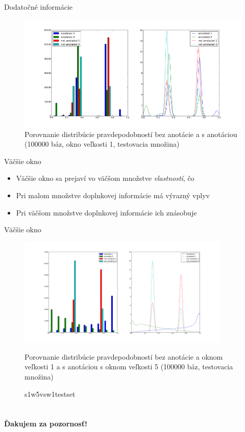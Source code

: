 \documentclass[xcolor=dvipsnames, compress, 12pt]{beamer}
\begin{document}
\begin{frame}{Dodatočné informácie}  
\begin{figure}[hbtp]
    \centering
    \includegraphics[width=\textwidth]{images/porovnanie_s1w1testset.png}
    \caption{Porovnanie distribúcie pravdepodobností bez anotácie a s anotáciou (100000 báz, okno veľkosti 1, testovacia množina)}    
    \label{fig:porovnanie_s1w1testset.png} 
\end{figure}
\end{frame}

\begin{frame}{Väčšie okno}  
  \begin{itemize}
    \item Väčšie okno sa prejaví vo väčšom množstve \textit{vlastností}, čo 
    \item Pri malom množstve doplnkovej informácie má výrazný vplyv 
    \item Pri väčšom množstve doplnkovej informácie ich znásobuje
  \end{itemize} 
\end{frame}

\begin{frame}{Väčšie okno}  
\begin{figure}[hbtp]
    \centering
    \includegraphics[width=0.9\textwidth]{images/porovnanie_s1w5vsw1testset.png}
    \caption{Porovnanie distribúcie pravdepodobností bez anotácie a oknom veľkosti 1 a s anotáciou s oknom veľkosti 5 (100000 báz, testovacia množina)}
    \caption{s1w5vsw1testset}    
    \label{fig:porovnanie_s1w5vsw1testset.png} 
\end{figure}
\end{frame}


\section{}
\begin{frame}[plain]
  \transdissolve[duration=5]
  \begin{center}
  \textbf{\color{Green} \LARGE Ďakujem za pozornosť!} 
  \end{center}  
\end{frame}
\end{document}
